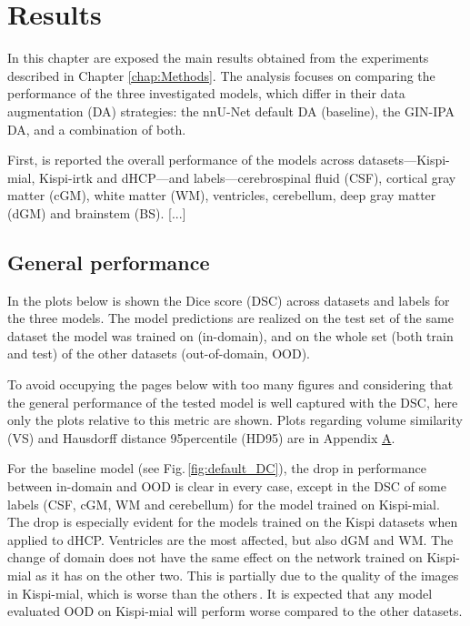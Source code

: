 \chapter{Results} \label{chap:Results}
\vspace{1cm}

In this chapter are exposed the main results obtained from the experiments described in Chapter \ref{chap:Methods}. The analysis focuses on comparing the performance of the three investigated models, which differ in their data augmentation (DA) strategies: the nnU-Net default DA (baseline), the GIN-IPA DA, and a combination of both.

First, is reported the overall performance of the models across datasets---Kispi-mial, Kispi-irtk and dHCP---and labels---cerebrospinal fluid (CSF), cortical gray matter (cGM), white matter (WM), ventricles, cerebellum, deep gray matter (dGM) and brainstem (BS). [...]

\section{General performance} \label{sec:GeneralPerformance}
In the plots below is shown the Dice score (DSC) across datasets and labels for the three models. The model predictions are realized on the test set of the same dataset the model was trained on (in-domain), and on the whole set (both train and test) of the other datasets (out-of-domain, OOD).

To avoid occupying the pages below with too many figures and considering that the general performance of the tested model is well captured with the DSC, here only the plots relative to this metric are shown. Plots regarding volume similarity (VS) and Hausdorff distance 95\th percentile (HD95) are in Appendix \hyperref[app:SupplementaryPlots]{A}.

For the baseline model (see Fig.\,\ref{fig:default_DC}), the drop in performance between in-domain and OOD is clear in every case, except in the DSC of some labels (CSF, cGM, WM and cerebellum) for the model trained on Kispi-mial. The drop is especially evident for the models trained on the Kispi datasets when applied to dHCP. Ventricles are the most affected, but also dGM and WM. The change of domain does not have the same effect on the network trained on Kispi-mial as it has on the other two. This is partially due to the quality of the images in Kispi-mial, which is worse than the others\,\cite{FeTA2022_review}. It is expected that any model evaluated OOD on Kispi-mial will perform worse compared to the other datasets.

